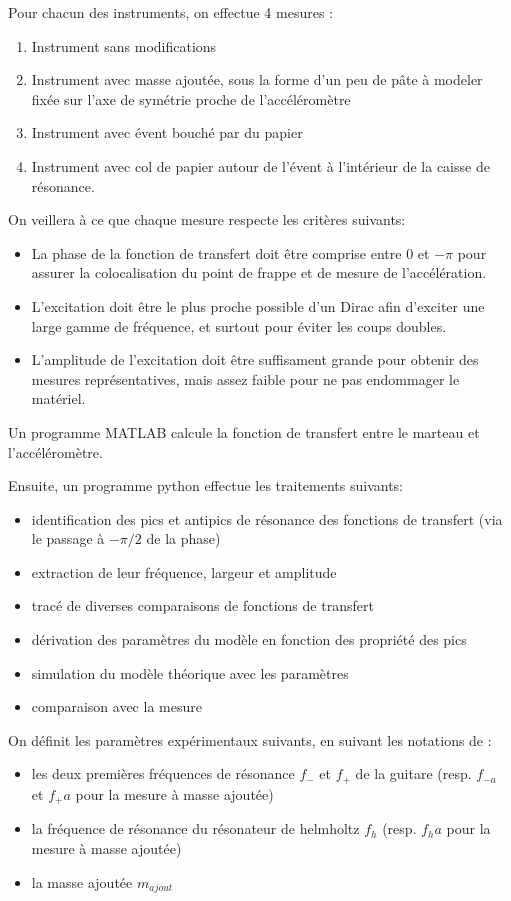 \documentclass[atiam, article]{rapport} %
\begin{document}
Pour chacun des instruments, on effectue 4 mesures :
\begin{enumerate}
    \item Instrument sans modifications
    \item Instrument avec masse ajoutée, sous la forme d'un peu de pâte à modeler fixée sur l'axe de symétrie proche de l'accéléromètre
    \item Instrument avec évent bouché par du papier
    \item Instrument avec col de papier autour de l'évent à l'intérieur de la caisse de résonance.
\end{enumerate}

On veillera à ce que chaque mesure respecte les critères suivants:

\begin{itemize}
    \item La phase de la fonction de transfert doit être comprise entre $0$ et $-\pi$ pour assurer la colocalisation du point de frappe et de mesure de l'accélération.
    \item L'excitation doit être le plus proche possible d'un Dirac afin d'exciter une large gamme de fréquence, et surtout pour éviter les coups doubles.\item L'amplitude de l'excitation doit être suffisament grande pour obtenir des mesures représentatives, mais assez faible pour ne pas endommager le matériel.
\end{itemize}

Un programme MATLAB calcule la fonction de transfert entre le marteau et l'accéléromètre.

Ensuite, un programme python effectue les traitements suivants:
\begin{itemize}
    \item identification des pics et antipics de résonance des fonctions de transfert (via le passage à $-\pi/2$ de la phase)
    \item extraction de leur fréquence, largeur et amplitude
    \item tracé de diverses comparaisons de fonctions de transfert
    \item dérivation des paramètres du modèle en fonction des propriété des pics
    \item simulation du modèle théorique avec les paramètres
    \item comparaison avec la mesure
\end{itemize}

On définit les paramètres expérimentaux suivants, en suivant les notations de \cite{10.1121/1.384814}:
\begin{itemize}
    \item les deux premières fréquences de résonance $f_-$ et $f_+$ de la guitare (resp. $f_{-a}$ et $f_+a$ pour la mesure à masse ajoutée)
    \item la fréquence de résonance du résonateur de helmholtz $f_h$ (resp. $f_ha$ pour la mesure à masse ajoutée)
    \item la masse ajoutée $m_{ajout}$
\end{itemize}
\end{document}
